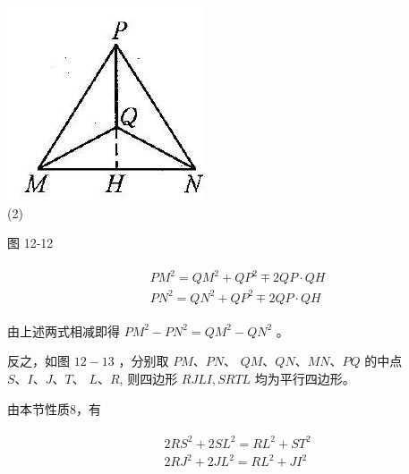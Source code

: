 \documentclass[10pt]{article}
\begin{document}
\includegraphics[max width=\textwidth, center]{2024_10_30_2c8f45efd4a519b08e1ag-116}\\
(2)

图 12-12

\begin{align*}
\begin{aligned}
& P M^{2}=Q M^{2}+Q P^{2} \mp 2 Q P \cdot Q H \\
& P N^{2}=Q N^{2}+Q P^{2} \mp 2 Q P \cdot Q H
\end{aligned}
\end{align*}

由上述两式相减即得 $P M^{2}-P N^{2}=Q M^{2}-Q N^{2}$ 。

反之，如图 $12-13$ ，分别取 $P M 、 P N 、$ $Q M 、 Q N 、 M N 、 P Q$ 的中点 $S 、 I 、 J 、 T 、$ $L 、 R$, 则四边形 $R J L I, S R T L$ 均为平行四边形。

由本节性质8，有

\begin{align*}
\begin{aligned}
& 2 R S^{2}+2 S L^{2}=R L^{2}+S T^{2} \\
& 2 R J^{2}+2 J L^{2}=R L^{2}+J I^{2}
\end{aligned}
\end{align*}
\end{document}
